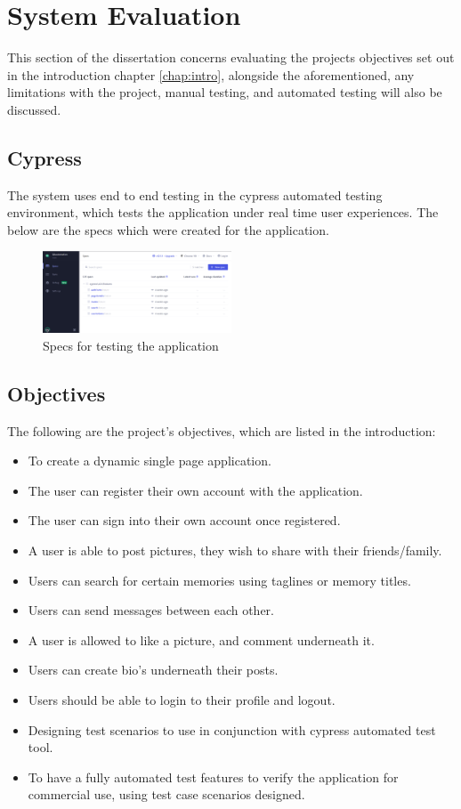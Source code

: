 \chapter{System Evaluation}\label{chap:Eval}
This section of the dissertation concerns evaluating the projects objectives set out in the introduction chapter \ref{chap:intro}, alongside the aforementioned, any limitations with the project, manual testing, and automated testing will also be discussed. 

\section{Cypress}
The system uses end to end testing \cite{E2ETesing} in the cypress automated testing environment, which tests the application under real time user experiences. The below are the specs which were created for the application.

\begin{figure}[h!]
    \centering
    \includegraphics[width=0.5\textwidth]{images/spec.png}
    \caption{Specs for testing the application}
    \label{image:spec}
\end{figure}

\section{Objectives}
The following are the project's objectives, which are listed in the introduction:

\begin{itemize}
    \item To create a dynamic single page application.
    \item The user can register their own account with the application.
    \item The user can sign into their own account once     	registered.
    \item A user is able to post pictures, they wish to share with their friends/family.
    \item Users can search for certain memories using taglines or memory titles.
    \item Users can send messages between each other.
    \item A user is allowed to like a picture, and comment underneath it.
    \item Users can create bio's underneath their posts.
    \item Users should be able to login to their profile and logout.
    \item Designing test scenarios to use in conjunction with cypress automated test tool. 
    \item To have a fully automated test features to verify    the application for commercial use, using test case scenarios designed.
\end{itemize}

